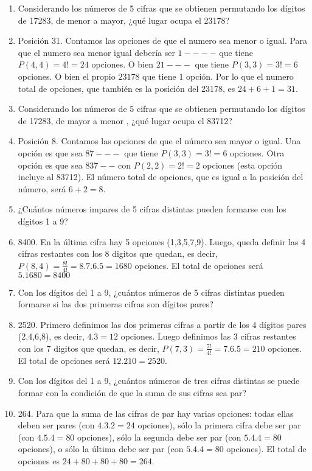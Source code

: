 \documentclass[a4paper]{article}
\newcommand{\answer}{\item[**]}
\begin{document}
\begin{enumerate}
\begin{enumerate} [label=(\alph*)]
		\item Considerando los números de 5 cifras que se obtienen permutando los dígitos de 17283, de menor a mayor, ¿qué lugar ocupa el 23178?
		\answer Posición 31. Contamos las opciones de que el numero sea menor o igual. Para que el numero sea menor igual debería ser $1----$ que tiene $P(4,4)=4!=24$ opciones. O bien $21---$ que tiene $P(3,3)=3!=6$ opciones. O bien el propio $23178$ que tiene $1$ opción. Por lo que el numero total de opciones, que también es la posición del 23178, es $24+6+1=31$.

		\item Considerando los números de 5 cifras que se obtienen permutando los dígitos de 17283, de mayor a menor , ¿qué lugar ocupa el 83712?
		\answer Posición 8. Contamos las opciones de que el número sea mayor o igual. Una opción es que sea $87---$ que tiene $P(3,3)=3!=6$ opciones. Otra opción es que sea $837--$ con $P(2,2)=2!=2$ opciones (esta opción incluye al 83712). El número total de opciones, que es igual a la posición del número, será $6+2=8$.

		\item ¿Cuántos números impares de 5 cifras distintas pueden formarse con los dígitos 1 a 9?
		\answer 8400. En la última cifra hay 5 opciones (1,3,5,7,9). Luego, queda definir las 4 cifras restantes con los 8 digitos que quedan, es decir, $P(8,4)=\frac{8!}{4!}=8.7.6.5=1680$ opciones. El total de opciones será $5.1680=8400$

		\item Con los dígitos del 1 a 9, ¿cuántos números de 5 cifras distintas pueden formarse si las dos primeras cifras son dígitos pares?
		\answer 2520. Primero definimos las dos primeras cifras a partir de los 4 dígitos pares (2,4,6,8), es decir, $4.3=12$ opciones. Luego definimos las 3 cifras restantes con los 7 digitos que quedan, es decir, $P(7,3)=\frac{7!}{4!}=7.6.5=210$ opciones. El total de opciones será $12.210=2520$.

		\item Con los dígitos del 1 a 9, ¿cuántos números de tres cifras distintas se puede formar con la condición de que la suma de sus cifras sea par?
		\answer 264. Para que la suma de las cifras de par hay varias opciones: todas ellas deben ser pares (con $4.3.2=24$ opciones), sólo la primera cifra debe ser par (con $4.5.4=80$ opciones), sólo la segunda debe ser par (con $5.4.4=80$ opciones), o sólo la última debe ser par (con $5.4.4=80$ opciones). El total de opciones es $24+80+80+80=264$.


\end{enumerate}
\end{enumerate}
\end{document}
